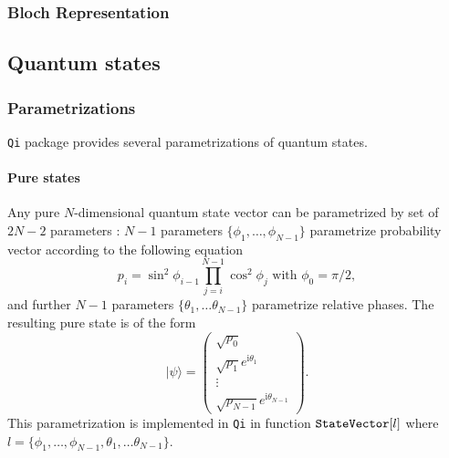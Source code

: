 \documentclass[11pt,a4paper]{article}
\newcommand{\qi}{\texttt{Qi}}
\newcommand{\ket}[1]{\ensuremath{|#1\rangle}}
\newcommand{\1}{{\bf 1}}
\newcommand{\ii}{\mathrm{i}}
\newcommand{\fname}[1]{\text{\texttt{#1}}}
\begin{document}
\subsubsection{Bloch Representation}

\subsection{Quantum states}

\subsubsection{Parametrizations}
\qi{} package provides several parametrizations of quantum states. 

\paragraph{Pure states}
Any pure $N$-dimensional quantum state vector can be parametrized by set of 
$2N-2$ parameters \cite{vedra98entanglement}: $N-1$ parameters $\{\phi_1, 
\ldots, 
\phi_{N-1}\}$ parametrize probability vector according to the following equation
\begin{equation}
p_i=\sin^2\phi_{i-1} \prod\limits_{j=i}^{N-1}\cos^2\phi_j\text{\ \ with 
}\phi_0=\pi/2,
\end{equation}
and further $N-1$ parameters $\{\theta_1, \ldots
\theta_{N-1}\}$ parametrize relative phases. The resulting pure state 
is of the form
\begin{equation}
\ket{\psi}=
\left(
\begin{array}{c}
\sqrt{p_0}\\
\sqrt{p_1}e^{\ii \theta_1}\\
\vdots\\
\sqrt{p_{N-1}}e^{\ii \theta_{N-1}}
\end{array}
\right).
\end{equation}
This parametrization is implemented in \qi{} in function
$\fname{StateVector}[l]$ where $l=\{\phi_1, \ldots, \phi_{N-1}, \theta_1, \ldots
\theta_{N-1}\}$.
\end{document}

